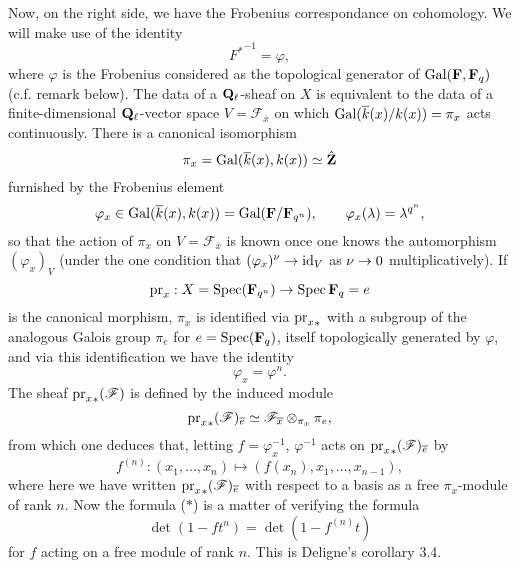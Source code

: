 \documentclass[deligne.tex]{subfiles}
\begin{document}
Now, on the right side, we have the Frobenius correspondance on cohomology.
We will make use of the identity
\begin{equation*} {F^\ast}^{-1}=\varphi,\end{equation*}
where $\varphi$ is the Frobenius considered as the topological generator
of $\operatorname{Gal}(\mathbf{F},\mathbf{F}_q)$ (c.f. remark below).
The data of a $\mathbf{Q}_\ell$-sheaf on $X$ is equivalent to the data of a
finite-dimensional $\mathbf{Q}_\ell$-vector space $V=\mathscr F_{\overline x}$ on
which $\operatorname{Gal}(\overline k(x)/k(x))=\pi_x$ acts continuously.
There is a canonical isomorphism
\begin{equation*}
    \pi_x=\operatorname{Gal}(\overline k(x),k(x))\simeq\hat{\mathbf{Z}}
\end{equation*}
furnished by the Frobenius element
\begin{equation*}
    \varphi_x\in\operatorname{Gal}(\overline k(x),k(x))=\operatorname{Gal}(\mathbf{F}/\mathbf{F}_{q^n}),\qquad
    \varphi_x(\lambda)=\lambda^{q^n},
\end{equation*}
so that the action of $\pi_x$ on $V=\mathscr F_{\overline x}$ is known once
one knows the automorphism $(\varphi_x)_V$ (under the one condition that
$(\varphi_x)^\nu\rightarrow\operatorname{id}_V$ as $\nu\rightarrow0$ multiplicatively). If
\begin{equation*} \operatorname{pr}_x:X=\operatorname{Spec}(\mathbf{F}_{q^n})\rightarrow\operatorname{Spec}\mathbf{F}_q=e\end{equation*}
is the canonical morphism, $\pi_x$ is identified via ${\operatorname{pr}_x}_\ast$
with a subgroup of the analogous Galois group $\pi_e$ for $e=\operatorname{Spec}(\mathbf{F}_q)$,
itself topologically generated by $\varphi$, and via this identification
we have the identity \begin{equation*} \varphi_x=\varphi^n.\end{equation*}
The sheaf ${\operatorname{pr}_x}_\ast(\mathscr F)$ is defined by the induced module
\begin{equation*}
    {\operatorname{pr}_x}_\ast(\mathscr F)_{\overline e}\simeq\mathscr F_{\overline x}
    \otimes_{\pi_x}\pi_e,
\end{equation*}
from which one deduces that, letting $f=\varphi_x^{-1}$,
$\varphi^{-1}$ acts on ${\operatorname{pr}_x}_\ast(\mathscr F)_{\overline e}$ by
\begin{equation*}
f^{(n)}:(x_1,\ldots,x_n)\mapsto(f(x_n),x_1,\ldots,x_{n-1}),
\end{equation*}
where here we have written ${\operatorname{pr}_x}_\ast(\mathscr F)_{\overline e}$ with 
respect to a basis as a free $\pi_x$-module of rank $n$.
Now the formula ($\ast$) is a matter of verifying the formula
\begin{equation*}
    \det(1-f t^n)=\det(1-f^{(n)} t)
\end{equation*}
for $f$ acting on a free module of rank $n$. This is Deligne's
corollary 3.4.
\end{document}
